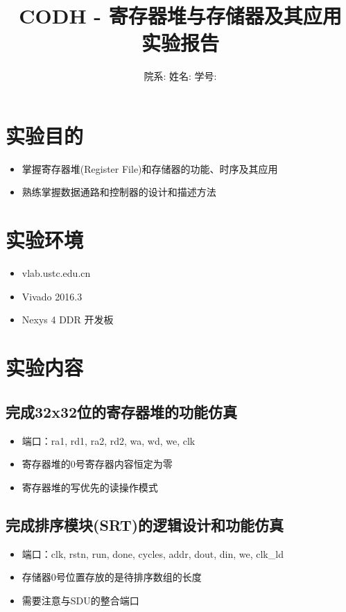 \documentclass[a4paper]{article}
\title{\heiti 
CODH - 寄存器堆与存储器及其应用 \hspace{0.3cm}实验报告}
\author{院系: \kaishu\underline{}\hspace{1.5cm}姓名: \kaishu \underline{}\hspace{1.5cm}学号: \kaishu \underline{}\hspace{1.5cm}}
\begin{document}
\maketitle

\section{实验目的}
\begin{itemize}
    \item 掌握寄存器堆(Register File)和存储器的功能、时序及其应用
    \item 熟练掌握数据通路和控制器的设计和描述方法
    
    
\end{itemize}

\section{实验环境}
\begin{itemize}
  \item vlab.ustc.edu.cn
  \item Vivado 2016.3
  \item Nexys 4 DDR 开发板
\end{itemize}
\section{实验内容}
\subsection{完成32x32位的寄存器堆的功能仿真}
\begin{itemize}
  \item 端口：ra1, rd1, ra2, rd2, wa, wd, we, clk
  \item 寄存器堆的0号寄存器内容恒定为零
  \item 寄存器堆的写优先的读操作模式
  
\end{itemize}

\subsection{完成排序模块(SRT)的逻辑设计和功能仿真}
\begin{itemize}
    \item 端口：clk, rstn, run, done, cycles, addr, dout, din, we, clk\_ld
    \item 存储器0号位置存放的是待排序数组的长度
    \item 需要注意与SDU的整合端口
  \end{itemize}
  
\end{document}
